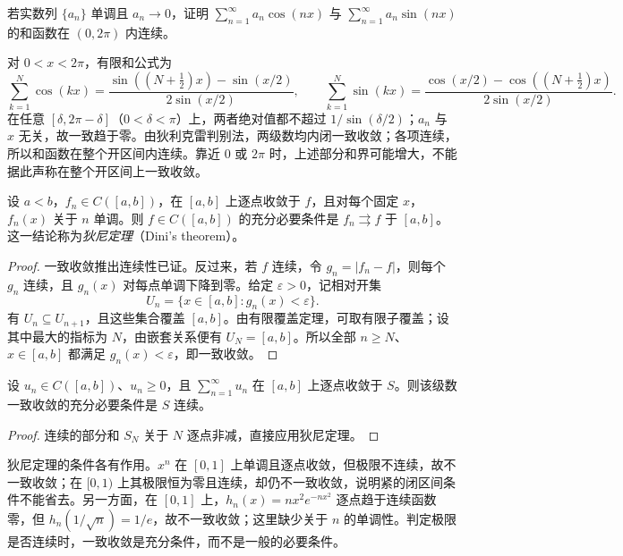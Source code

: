 \begin{example}
\label{ex:locally-uniform-trigonometric-series}
若实数列 $\{a_n\}$ 单调且 $a_n\to0$，证明 $\sum_{n=1}^\infty a_n\cos(nx)$ 与 $\sum_{n=1}^\infty a_n\sin(nx)$ 的和函数在 $(0,2\pi)$ 内连续。
\end{example}

\begin{solve}
对 $0<x<2\pi$，有限和公式为
\[
    \sum_{k=1}^N\cos(kx)
      =\frac{\sin((N+\tfrac12)x)-\sin(x/2)}{2\sin(x/2)},
    \qquad
    \sum_{k=1}^N\sin(kx)
      =\frac{\cos(x/2)-\cos((N+\tfrac12)x)}{2\sin(x/2)}.
\]
在任意 $[\delta,2\pi-\delta]$（$0<\delta<\pi$）上，两者绝对值都不超过 $1/\sin(\delta/2)$；$a_n$ 与 $x$ 无关，故一致趋于零。由狄利克雷判别法，两级数均内闭一致收敛；各项连续，所以和函数在整个开区间内连续。靠近 $0$ 或 $2\pi$ 时，上述部分和界可能增大，不能据此声称在整个开区间上一致收敛。
\end{solve}

\begin{theorem}[狄尼定理]
\label{thm:dini-uniform-convergence}
设 $a<b$，$f_n\in C([a,b])$，在 $[a,b]$ 上逐点收敛于 $f$，且对每个固定 $x$，$f_n(x)$ 关于 $n$ 单调。则 $f\in C([a,b])$ 的充分必要条件是 $f_n\rightrightarrows f$ 于 $[a,b]$。这一结论称为\emph{狄尼定理}（Dini's theorem）。
\end{theorem}

\begin{proof}
一致收敛推出连续性已证。反过来，若 $f$ 连续，令 $g_n=|f_n-f|$，则每个 $g_n$ 连续，且 $g_n(x)$ 对每点单调下降到零。给定 $\varepsilon>0$，记相对开集
\[
    U_n=\{x\in[a,b]:g_n(x)<\varepsilon\}.
\]
有 $U_n\subseteq U_{n+1}$，且这些集合覆盖 $[a,b]$。由有限覆盖定理，可取有限子覆盖；设其中最大的指标为 $N$，由嵌套关系便有 $U_N=[a,b]$。所以全部 $n\geq N$、$x\in[a,b]$ 都满足 $g_n(x)<\varepsilon$，即一致收敛。
\end{proof}

\begin{corollary}[非负项级数的狄尼定理]
\label{cor:dini-nonnegative-function-series}
设 $u_n\in C([a,b])$、$u_n\geq0$，且 $\sum_{n=1}^\infty u_n$ 在 $[a,b]$ 上逐点收敛于 $S$。则该级数一致收敛的充分必要条件是 $S$ 连续。
\end{corollary}

\begin{proof}
连续的部分和 $S_N$ 关于 $N$ 逐点非减，直接应用狄尼定理。
\end{proof}

狄尼定理的条件各有作用。$x^n$ 在 $[0,1]$ 上单调且逐点收敛，但极限不连续，故不一致收敛；在 $[0,1)$ 上其极限恒为零且连续，却仍不一致收敛，说明紧的闭区间条件不能省去。另一方面，在 $[0,1]$ 上，$h_n(x)=nx^2e^{-nx^2}$ 逐点趋于连续函数零，但 $h_n(1/\sqrt n)=1/e$，故不一致收敛；这里缺少关于 $n$ 的单调性。判定极限是否连续时，一致收敛是充分条件，而不是一般的必要条件。


